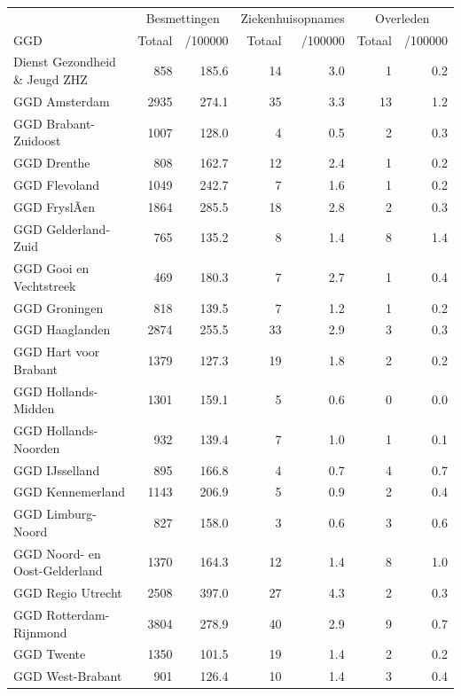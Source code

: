 \documentclass[
  english,
  man,floatsintext]{apa6}
\begin{document}
\begin{table}
\centering\begingroup\fontsize{10}{12}\selectfont

\begin{threeparttable}
\begin{tabular}{lrrrrrr}
\toprule
\multicolumn{1}{c}{ } & \multicolumn{2}{c}{Besmettingen} & \multicolumn{2}{c}{Ziekenhuisopnames} & \multicolumn{2}{c}{Overleden} \\
\cmidrule(l{3pt}r{3pt}){2-3} \cmidrule(l{3pt}r{3pt}){4-5} \cmidrule(l{3pt}r{3pt}){6-7}
GGD & Totaal & /100000 & Totaal & /100000 & Totaal & /100000\\
\midrule
Dienst Gezondheid \& Jeugd ZHZ & 858 & 185.6 & 14 & 3.0 & 1 & 0.2\\
GGD Amsterdam & 2935 & 274.1 & 35 & 3.3 & 13 & 1.2\\
GGD Brabant-Zuidoost & 1007 & 128.0 & 4 & 0.5 & 2 & 0.3\\
GGD Drenthe & 808 & 162.7 & 12 & 2.4 & 1 & 0.2\\
GGD Flevoland & 1049 & 242.7 & 7 & 1.6 & 1 & 0.2\\
GGD FryslÃ¢n & 1864 & 285.5 & 18 & 2.8 & 2 & 0.3\\
GGD Gelderland-Zuid & 765 & 135.2 & 8 & 1.4 & 8 & 1.4\\
GGD Gooi en Vechtstreek & 469 & 180.3 & 7 & 2.7 & 1 & 0.4\\
GGD Groningen & 818 & 139.5 & 7 & 1.2 & 1 & 0.2\\
GGD Haaglanden & 2874 & 255.5 & 33 & 2.9 & 3 & 0.3\\
GGD Hart voor Brabant & 1379 & 127.3 & 19 & 1.8 & 2 & 0.2\\
GGD Hollands-Midden & 1301 & 159.1 & 5 & 0.6 & 0 & 0.0\\
GGD Hollands-Noorden & 932 & 139.4 & 7 & 1.0 & 1 & 0.1\\
GGD IJsselland & 895 & 166.8 & 4 & 0.7 & 4 & 0.7\\
GGD Kennemerland & 1143 & 206.9 & 5 & 0.9 & 2 & 0.4\\
GGD Limburg-Noord & 827 & 158.0 & 3 & 0.6 & 3 & 0.6\\
GGD Noord- en Oost-Gelderland & 1370 & 164.3 & 12 & 1.4 & 8 & 1.0\\
GGD Regio Utrecht & 2508 & 397.0 & 27 & 4.3 & 2 & 0.3\\
GGD Rotterdam-Rijnmond & 3804 & 278.9 & 40 & 2.9 & 9 & 0.7\\
GGD Twente & 1350 & 101.5 & 19 & 1.4 & 2 & 0.2\\
GGD West-Brabant & 901 & 126.4 & 10 & 1.4 & 3 & 0.4\\

\end{tabular}
\end{threeparttable}
\end{table}
\end{document}
